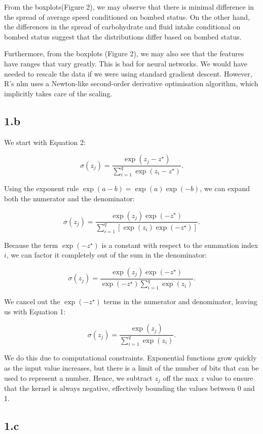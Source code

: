 \documentclass[12pt,halfline,a4paper,]{ouparticle}
\begin{document}
From the boxplots(Figure 2), we may observe that there is minimal
difference in the spread of average speed conditioned on bombed status.
On the other hand, the differences in the spread of carbohydrate and
fluid intake conditional on bombed status suggest that the distributions
differ based on bombed status.

Furthermore, from the boxplots (Figure 2), we may also see that the
features have ranges that vary greatly. This is bad for neural networks.
We would have needed to rescale the data if we were using standard
gradient descent. However, R's nlm uses a Newton-like second-order
derivative optimisation algorithm, which implicitly takes care of the
scaling.

\subsection*{1.b}\label{b}

We start with Equation 2:

\[
\sigma(z_j) = \frac{\exp(z_j - z^\star)}{\sum_{i=1}^q \exp(z_i - z^\star)}.
\]

Using the exponent rule \(\exp(a - b) = \exp(a)\exp(-b)\), we can expand
both the numerator and the denominator:

\[
\sigma(z_j) = \frac{\exp(z_j)\exp(-z^\star)}{\sum_{i=1}^q [\exp(z_i)\exp(-z^\star)]}.
\]

Because the term \(\exp(-z^\star)\) is a constant with respect to the
summation index \(i\), we can factor it completely out of the sum in the
denominator:

\[
\sigma(z_j) = \frac{\exp(z_j)\exp(-z^\star)}{\exp(-z^\star) \sum_{i=1}^q \exp(z_i)}.
\]

We cancel out the \(\exp(-z^\star)\) terms in the numerator and
denominator, leaving us with Equation 1:

\[
\sigma(z_j) = \frac{\exp(z_j)}{\sum_{i=1}^q \exp(z_i)}.
\]

We do this due to computational constraints. Exponential functions grow
quickly as the input value increases, but there is a limit of the number
of bits that can be used to represent a number. Hence, we subtract
\(z_j\) off the max \(z\) value to ensure that the kernel is always
negative, effectively bounding the values between 0 and 1.

\subsection*{1.c}\label{c}
\end{document}
